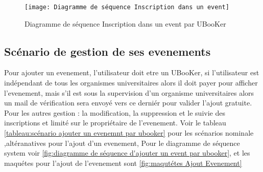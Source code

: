 \documentclass[12pt]{report}
\begin{document}
\begin{figure}[hbtp]
    \centering
    \texttt{[image: Diagramme de séquence Inscription dans un event]}
    \caption{Diagramme de séquence Inscription dans un event par UBooKer}
    \label{fig:diagramme de séquence inscription dans un evenet par ubooker}
\end{figure}
\newpage

\subsection{Scénario de gestion de ses evenements}

Pour ajouter un evenement, l'utilisateur doit etre un UBooKer, si l'utilisateur est indépendant de tous les organismes universitaires alors il doit payer pour afficher l'evenement, mais s'il est sous la supervision d'un organisme universitaires alors un mail de vérification sera envoyé vers ce derniér pour valider l'ajout gratuite.
Pour les autres gestion : la modification, la suppression et le suivie des inscriptions et limité sur le propriétaire de l'evenement.
Voir le tableau \ref{tableau:scénario ajouter un evenemnt par ubooker} pour les scénarios nominale ,altéranatives pour l'ajout d'un evenement, Pour le diagramme de séquence system voir \ref{fig:diagramme de séquence d'ajouter un event par ubooker}, et les maquétes pour l'ajout de l'evenement sont \ref{fig:maqutétes Ajout Evenement}
\end{document}
